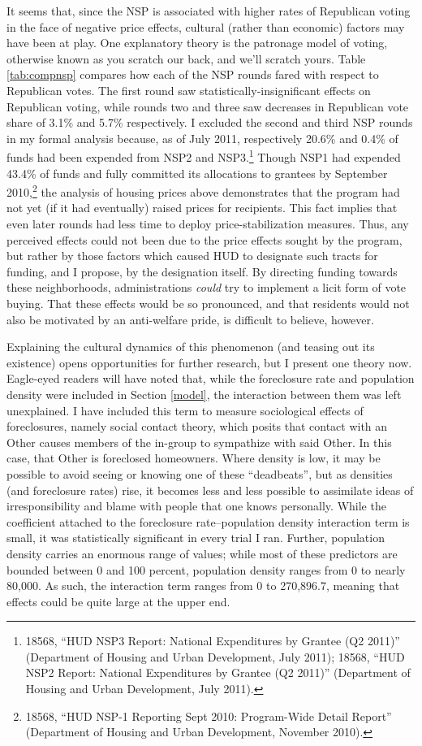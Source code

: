 \documentclass[12pt,oneside]{psthesis}
\begin{document}
It seems that, since the NSP is associated with higher rates of Republican voting in the face of negative price effects, cultural (rather than economic) factors may have been at play.
One explanatory theory is the patronage model of voting, otherwise known as you scratch our back, and we'll scratch yours.
Table \ref{tab:compnsp} compares how each of the NSP rounds fared with respect to Republican votes.
The first round saw statistically-insignificant effects on Republican voting, while rounds two and three saw decreases in Republican vote share of 3.1\% and 5.7\% respectively.
I excluded the second and third NSP rounds in my formal analysis because, as of July 2011, respectively 20.6\% and 0.4\% of funds had been expended from NSP2 and NSP3.\footnote{18568, ``HUD NSP3 Report: National Expenditures by Grantee (Q2 2011)'' (Department of Housing and Urban Development, July 2011); 18568, ``HUD NSP2 Report: National Expenditures by Grantee (Q2 2011)'' (Department of Housing and Urban Development, July 2011).}
Though NSP1 had expended 43.4\% of funds and fully committed its allocations to grantees by September 2010,\footnote{18568, ``HUD NSP-1 Reporting Sept 2010: Program-Wide Detail Report'' (Department of Housing and Urban Development, November 2010).} the analysis of housing prices above demonstrates that the program had not yet (if it had eventually) raised prices for recipients.
This fact implies that even later rounds had less time to deploy price-stabilization measures.
Thus, any perceived effects could not been due to the price effects sought by the program, but rather by those factors which caused HUD to designate such tracts for funding, and I propose, by the designation itself.
By directing funding towards these neighborhoods, administrations \emph{could} try to implement a licit form of vote buying.
That these effects would be so pronounced, and that residents would not also be motivated by an anti-welfare pride, is difficult to believe, however.

Explaining the cultural dynamics of this phenomenon (and teasing out its existence) opens opportunities for further research, but I present one theory now.
Eagle-eyed readers will have noted that, while the foreclosure rate and population density were included in Section \ref{model}, the interaction between them was left unexplained.
I have included this term to measure sociological effects of foreclosures, namely social contact theory, which posits that contact with an Other causes members of the in-group to sympathize with said Other.
In this case, that Other is foreclosed homeowners.
Where density is low, it may be possible to avoid seeing or knowing one of these ``deadbeats'', but as densities (and foreclosure rates) rise, it becomes less and less possible to assimilate ideas of irresponsibility and blame with people that one knows personally.
While the coefficient attached to the foreclosure rate--population density interaction term is small, it was statistically significant in every trial I ran.
Further, population density carries an enormous range of values; while most of these predictors are bounded between 0 and 100 percent, population density ranges from 0 to nearly 80,000.
As such, the interaction term ranges from 0 to 270,896.7, meaning that effects could be quite large at the upper end.
\end{document}
